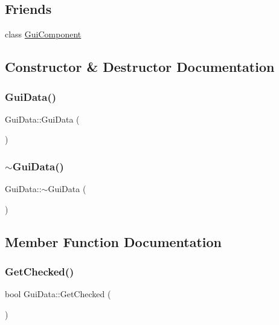 \subsection*{Friends}
\begin{DoxyCompactItemize}
\item 
class \mbox{\hyperlink{class_gui_data_ab7f63ac4717a09c5085d9be8d819a1a4}{Gui\+Component}}
\end{DoxyCompactItemize}


\subsection{Constructor \& Destructor Documentation}
\mbox{\label{class_gui_data_a7181d016e549441240fd6de9f5bcacc3}} 
\subsubsection{\texorpdfstring{GuiData()}{GuiData()}}
{\footnotesize\ttfamily Gui\+Data\+::\+Gui\+Data (\begin{DoxyParamCaption}{ }\end{DoxyParamCaption})}

\mbox{\label{class_gui_data_a15a76a20e98eabd9b41d0b6a16ec5e06}} 
\subsubsection{\texorpdfstring{$\sim$GuiData()}{~GuiData()}}
{\footnotesize\ttfamily Gui\+Data\+::$\sim$\+Gui\+Data (\begin{DoxyParamCaption}{ }\end{DoxyParamCaption})}



\subsection{Member Function Documentation}
\mbox{\label{class_gui_data_a18e0ba6efaf07646982350b14e78def3}} 
\subsubsection{\texorpdfstring{GetChecked()}{GetChecked()}}
{\footnotesize\ttfamily bool Gui\+Data\+::\+Get\+Checked (\begin{DoxyParamCaption}{ }\end{DoxyParamCaption})}

